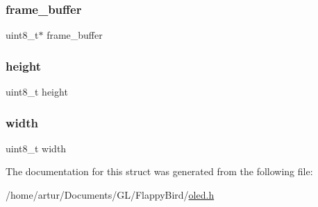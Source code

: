 \subsubsection{\texorpdfstring{frame\+\_\+buffer}{frame\_buffer}}
{\footnotesize\ttfamily uint8\+\_\+t$\ast$ frame\+\_\+buffer}

\mbox{\label{struct_o_l_e_d__s___adcf201a8aabf55cb352ec05331242594}} 
\subsubsection{\texorpdfstring{height}{height}}
{\footnotesize\ttfamily uint8\+\_\+t height}

\mbox{\label{struct_o_l_e_d__s___a09a2a45f731b02946ff6d3cd15c1a476}} 
\subsubsection{\texorpdfstring{width}{width}}
{\footnotesize\ttfamily uint8\+\_\+t width}



The documentation for this struct was generated from the following file\+:\begin{DoxyCompactItemize}
\item 
/home/artur/\+Documents/\+G\+L/\+Flappy\+Bird/\mbox{\hyperlink{oled_8h}{oled.\+h}}\end{DoxyCompactItemize}
